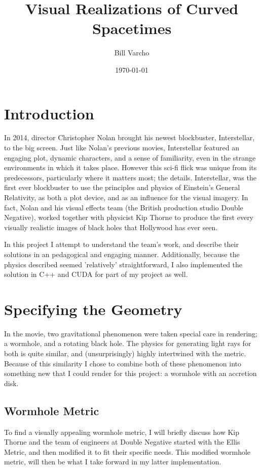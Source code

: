 \documentclass{article}
\begin{document}
\title{\textbf{Visual Realizations of Curved Spacetimes}}
\date{\today}
\author{Bill Varcho}
\maketitle

\section{Introduction}
	In 2014, director Christopher Nolan brought his newest blockbuster, Interstellar, to the big screen. Just like Nolan's previous movies, Interstellar featured an engaging plot, dynamic characters, and a sense of familiarity, even in the strange environments in which it takes place. However this sci-fi flick was unique from its predecessors, particularly where it matters most; the details. Interstellar, was the first ever blockbuster to use the principles and physics of Einstein's General Relativity, as both a plot device, and as an influence for the visual imagery. In fact, Nolan and his visual effects team (the British production studio Double Negative), worked together with physicist Kip Thorne to produce the first every visually realistic images of black holes that Hollywood has ever seen. \par
	In this project I attempt to understand the team's work, and describe their solutions in an pedagogical and engaging manner. Additionally, because the physics described seemed 'relatively' straightforward, I also implemented the solution in C++ and CUDA for part of my project as well. 
\section{Specifying the Geometry}
In the movie, two gravitational phenomenon were taken special care in rendering; a wormhole, and a rotating black hole. The physics for generating light rays for both is quite similar, and (unsurprisingly) highly intertwined with the metric. Because of this similarity I chose to combine both of these phenomenon into something new that I could render for this project: a wormhole with an accretion disk.
\subsection{Wormhole Metric}
To find a visually appealing wormhole metric, I will briefly discuss how Kip Thorne and the team of engineers at Double Negative started with the Ellis Metric, and then modified it to fit their specific needs. This modified wormhole metric, will then be what I take forward in my latter implementation.
\end{document}
